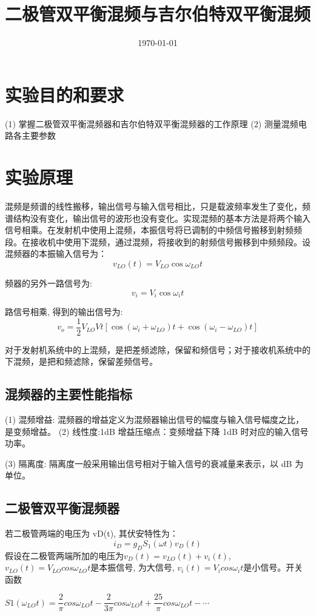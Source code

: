 \documentclass{../source/Experiment}
\title{二极管双平衡混频与吉尔伯特双平衡混频}
\date{\today}
\begin{document}
\section{实验目的和要求}
 (1) 掌握二极管双平衡混频器和吉尔伯特双平衡混频器的工作原理
(2) 测量混频电路各主要参数


\section{实验原理}
混频是频谱的线性搬移，输出信号与输入信号相比，只是载波频率发生了变化，频谱结构没有变化，输出信号的波形也没有变化。实现混频的基本方法是将两个输入信号相乘。在发射机中使用上混频，本振信号将已调制的中频信号搬移到射频频段。在接收机中使用下混频，通过混频，将接收到的射频信号搬移到中频频段。设混频器的本振输入信号为：
$$
    v_{L O}(t)=V_{L O} \cos \omega_{L O} t
$$

频器的另外一路信号为:
$$
    v_{i}=V_{i} \cos \omega_{i} t
$$

路信号相乘, 得到的输出信号为:
$$
    v_{o}=\frac{1}{2} V_{L O} V t\left[\cos \left(\omega_{i}+\omega_{L O}\right) t+\cos \left(\omega_{i}-\omega_{L O}\right) t\right]
$$

对于发射机系统中的上混频，是把差频滤除，保留和频信号；对于接收机系统中的下混频，是把和频滤除，保留差频信号。

\subsection{混频器的主要性能指标}
(1) 混频增益: 混频器的增益定义为混频器输出信号的幅度与输入信号幅度之比，是变频增益。
(2) 线性度:1dB 增益压缩点：变频增益下降 1dB 时对应的输入信号功率。

(3) 隔离度: 隔离度一般采用输出信号相对于输入信号的衰减量来表示，以 dB 为单位。

\subsection{二极管双平衡混频器}
若二极管两端的电压为 vD(t), 其伏安特性为：
$$
    i_D = g_DS_1(\omega t)v_D(t)
$$
假设在二极管两端所加的电压为$ v_D(t) = v_{LO}(t) + v_i(t)$, $v_{LO}(t) = V_{LO} cos \omega_{LO}t $是本振信号, 为大信号,
$v_i(t) = V_i cos \omega_it $是小信号。开关函数

$ S1 (\omega_{LO}t) = \dfrac{2}{\pi} cos \omega_{LO}t −\dfrac{2}{3\pi} cos \omega_{LO}t + \dfrac{25}{\pi}cos \omega_{LO}t − \cdots $
\end{document}

